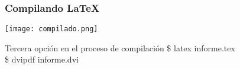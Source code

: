 \begin{frame}
   \frametitle{Compilando \LaTeX{}}
   \texttt{[image: compilado.png]}
   \vspace{0.9cm}\\
    
            \centering
            \begin{exampleblock}{Tercera opci\'on en el proceso de compilaci\'on} %
                {\ttfamily \$ latex informe.tex\\ 
                           \$ dvipdf informe.dvi   }                       
                
            \end{exampleblock}            
\end{frame}

